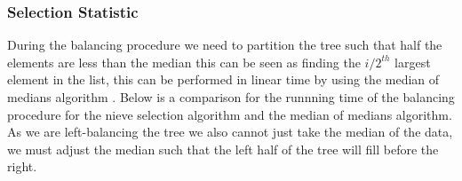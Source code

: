 \subsubsection{Selection Statistic}
During the balancing procedure we need to partition the tree such that half the elements are less than the median
this can be seen as finding the $i/2^{th}$ largest element in the list, this can be performed in linear time by using
the median of medians algorithm . Below is a comparison for the runnning time of the balancing procedure for
the nieve selection algorithm and the median of medians algorithm. As we are left-balancing the tree we also cannot
just take the median of the data, we must adjust the median such that the left half of the tree will fill before the right.
